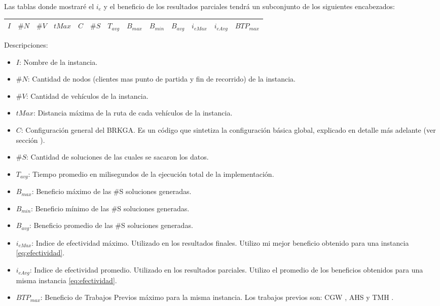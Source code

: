 \bigskip

Las tablas donde mostraré el $i_e$ y el beneficio de los resultados parciales tendrá un subconjunto de los siguientes encabezados:

\begin{center}
\begin{tabular}{ |c|c|c|c|c|c|c|c|c|c|c|c|c| } 
 \hline
$I$ & $\#N$ & $\#V$ & $tMax$ & $C$ & $\#S$ & $T_{avg}$ & $B_{max}$ & $B_{min}$ & $B_{avg}$ & $i_{eMax}$ & $i_{eAvg}$ & $BTP_{max}$ \\
\hline
\end{tabular}
\end{center}

\bigskip

Descripciones:
\begin{itemize}
	\item \textbf{$I$}: Nombre de la instancia.
	\item \textbf{$\#N$}: Cantidad de nodos (clientes mas punto de partida y fin de recorrido) de la instancia.
	\item \textbf{$\#V$}: Cantidad de vehículos de la instancia.
	\item \textbf{$tMax$}: Distancia máxima de la ruta de cada vehículos de la instancia.
	\item \textbf{$C$}: Configuración general del BRKGA. Es un código que sintetiza la configuración básica global, explicado en detalle más adelante (ver sección \label{sec:descrCongif}).
	\item \textbf{$\#S$}: Cantidad de soluciones de las cuales se sacaron los datos.
	\item \textbf{$T_{avg}$}: Tiempo promedio en milisegundos de la ejecución total de la implementación.
	\item \textbf{$B_{max}$}: Beneficio máximo de las \#S soluciones generadas.
	\item \textbf{$B_{min}$}: Beneficio mínimo de las \#S soluciones generadas.
	\item \textbf{$B_{avg}$}: Beneficio promedio de las \#S soluciones generadas.
	\item \textbf{$i_{eMax}$}: Indice de efectividad máximo. Utilizado en los resultados finales. Utilizo mi mejor beneficio obtenido para una instancia \eqref{eq:efectividad}.
	\item \textbf{$i_{eAvg}$}: Indice de efectividad promedio. Utilizado en los resultados parciales. Utilizo el promedio de los beneficios obtenidos para una misma instancia \eqref{eq:efectividad}.
	\item \textbf{$BTP_{max}$}: Beneficio de Trabajos Previos máximo para la misma instancia. Los trabajos previos son: CGW \cite{ChaoGoldenWasil}, AHS \cite{ArchettiHertzSperanza} y TMH \cite{TangMillerHooks}.
\end{itemize}


